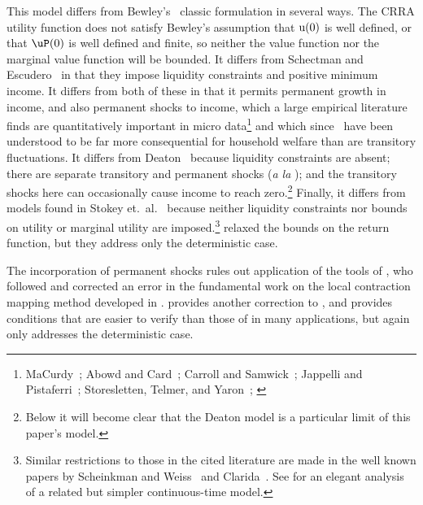 \documentclass[titlepage]{\econtex}\providecommand{\texname}{BufferStockTheory}
\begin{document}
\hypertarget{DiffWithLit}{} This model differs from Bewley's~\citeyearpar{bewleyPIH} classic formulation in several ways. The CRRA utility function does not satisfy Bewley's assumption that $\mathrm{u}(0)$ is well defined, or that $\uP(0)$ is well defined and finite, so neither the value function nor the marginal value function will be bounded.  It differs from Schectman and Escudero~\citeyearpar{seIncFluct} in that they impose liquidity constraints and positive minimum income.  It differs from both of these in that it permits permanent growth in income, and also permanent shocks to income, which a large empirical literature finds are quantitatively important in micro data\footnote{MaCurdy~\citeyearpar{macurdyTimeseries}; Abowd and Card~\citeyearpar{acCovariance}; Carroll and Samwick~\citeyearpar{csNature}; Jappelli and Pistaferri~\citeyearpar{jpCins}; Storesletten, Telmer, and Yaron~\citeyearpar{styConsumption}; \cite{blpRisk}} and which since~\cite{friedmanATheory} have been understood to be far more consequential for household welfare than are transitory fluctuations.  It differs from Deaton~\citeyearpar{deatonLiqConstr} because liquidity constraints are absent; there are separate transitory and permanent shocks ({\it a la} \cite{muthOptimal}); and the transitory shocks here can occasionally cause income to reach zero.\footnote{Below it will become clear that the Deaton model is a particular limit of this paper's model.}  Finally, it differs from models found in Stokey et.\ al.~\citeyearpar{slpMethods} because neither liquidity constraints nor bounds on utility or marginal utility are imposed.\footnote{Similar restrictions to those in the cited literature are made in the well known papers by Scheinkman and Weiss~\citeyearpar{scheinkman&weiss:borrowing} and Clarida~\citeyearpar{claridaErgodic}.  See \cite{tocheUrisk} for an elegant analysis of a related but simpler continuous-time model.}  \cite{asHomogeneous} relaxed the bounds on the return function, but they address only the deterministic case.

The incorporation of permanent shocks rules out application of the tools of \cite{mnUnique}, who followed and corrected an error in the fundamental work on the local contraction mapping method developed in \cite{rrExistence}.  \cite{mvExistence} provides another correction to \cite{rrExistence}, and provides conditions that are easier to verify than those of \cite{mvExistence} in many applications, but again only addresses the deterministic case.  

\hypertarget{The-Problem-Can-Be-Rewritten-in-Ratio-Form}{}
\end{document}
